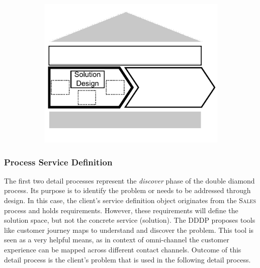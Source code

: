 	\begin{figure}[caption={\textsc{Solution Design} Process}, label={fig:soldes}]
		\begin{subfigure}[c]{.45\textwidth}
			\begin{center}
				\includegraphics{figures/processes/solutiondesign.pdf}
			\end{center}
		\end{subfigure}
		\begin{subfigure}[c]{.45\textwidth}
			\begin{center}
			\end{center}
		\end{subfigure}
		
	\end{figure}
	
	\subsubsection{Process Service Definition}
	The first two detail processes represent the \textit{discover} phase of the double diamond process. Its purpose is to identify the problem or needs to be addressed through design. In this case, the client's service definition object originates from the \textsc{Sales} process and holds requirements. However, these requirements will define the solution space, but not the concrete service (solution). The \acrshort{DDDP} proposes tools like customer journey maps to understand and discover the problem. This tool is seen as a very helpful means, as in context of omni-channel the customer experience can be mapped across different contact channels. Outcome of this detail process is the client's problem that is used in the following detail process. 
	
